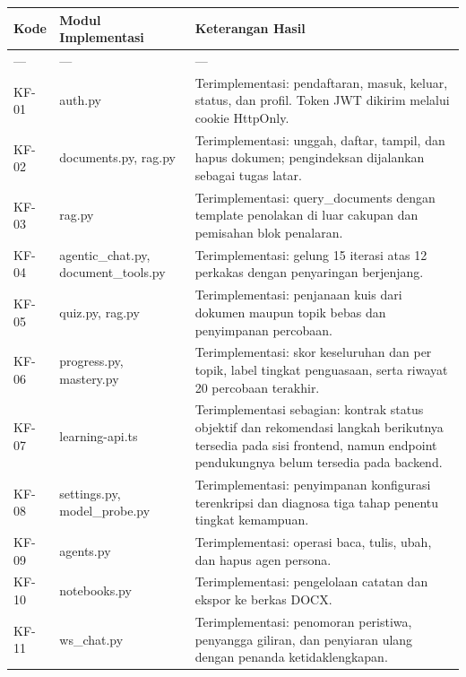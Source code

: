 \documentclass[12pt,a4paper]{article}
\begin{document}
\begin{table}[h]

\centering

\begin{tabular}{lll}

\toprule

Kode & Modul Implementasi & Keterangan Hasil \\

\midrule

--- & --- & --- \\

KF-01 & auth.py & Terimplementasi: pendaftaran, masuk, keluar, status, dan profil. Token JWT dikirim melalui cookie HttpOnly. \\

KF-02 & documents.py, rag.py & Terimplementasi: unggah, daftar, tampil, dan hapus dokumen; pengindeksan dijalankan sebagai tugas latar. \\

KF-03 & rag.py & Terimplementasi: query\_documents dengan template penolakan di luar cakupan dan pemisahan blok penalaran. \\

KF-04 & agentic\_chat.py, document\_tools.py & Terimplementasi: gelung 15 iterasi atas 12 perkakas dengan penyaringan berjenjang. \\

KF-05 & quiz.py, rag.py & Terimplementasi: penjanaan kuis dari dokumen maupun topik bebas dan penyimpanan percobaan. \\

KF-06 & progress.py, mastery.py & Terimplementasi: skor keseluruhan dan per topik, label tingkat penguasaan, serta riwayat 20 percobaan terakhir. \\

KF-07 & learning-api.ts & Terimplementasi sebagian: kontrak status objektif dan rekomendasi langkah berikutnya tersedia pada sisi frontend, namun endpoint pendukungnya belum tersedia pada backend. \\

KF-08 & settings.py, model\_probe.py & Terimplementasi: penyimpanan konfigurasi terenkripsi dan diagnosa tiga tahap penentu tingkat kemampuan. \\

KF-09 & agents.py & Terimplementasi: operasi baca, tulis, ubah, dan hapus agen persona. \\

KF-10 & notebooks.py & Terimplementasi: pengelolaan catatan dan ekspor ke berkas DOCX. \\

KF-11 & ws\_chat.py & Terimplementasi: penomoran peristiwa, penyangga giliran, dan penyiaran ulang dengan penanda ketidaklengkapan. \\

\bottomrule

\end{tabular}

\end{table}
\end{document}
